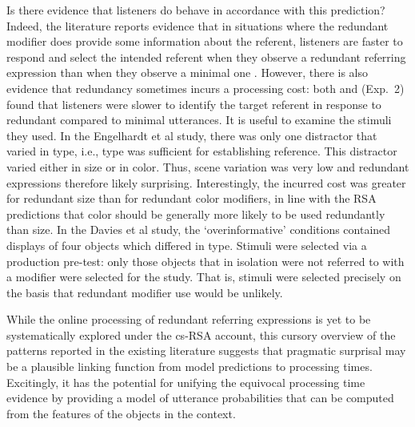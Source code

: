 \documentclass[11pt]{article}
\newcommand{\jd}[1]{\textcolor{Red}{[jd: #1]}}
\begin{document}
Is there evidence that listeners do behave in accordance with this prediction? Indeed, the literature reports evidence that in situations where the redundant modifier does provide some information about the referent, listeners are faster to respond and select the intended referent when they observe a redundant referring expression than when they observe a minimal one \cite{Arts2011,  Paraboni2007}. However, there is also evidence that redundancy sometimes incurs a processing cost: both  and  (Exp.~2) found that listeners were slower to identify the target referent in response to redundant compared to minimal utterances. It is useful to examine the stimuli they used. In the Engelhardt et al study, there was only one distractor that varied in type, i.e., type was sufficient for establishing reference. This distractor varied either in size or in color. Thus, scene variation was very low and redundant expressions therefore likely surprising. Interestingly, the incurred cost was greater for redundant size than for redundant color modifiers, in line with the RSA predictions that color should be generally more likely to be used redundantly than size. In the Davies et al study, the `overinformative' conditions contained displays of four objects which differed in type. Stimuli were selected via a production pre-test: only those objects that in isolation were not referred to with a modifier were selected for the study. That is, stimuli were selected precisely on the basis that redundant modifier use would be unlikely.

While the online processing of redundant referring expressions is yet to be systematically explored under the cs-RSA account, this cursory overview of the patterns reported in the existing literature suggests that pragmatic surprisal may be a plausible linking function from model predictions to processing times. Excitingly, it has the potential for unifying the equivocal processing time evidence by providing a model of utterance probabilities that can be computed from the features of the objects in the context.



\end{document}
